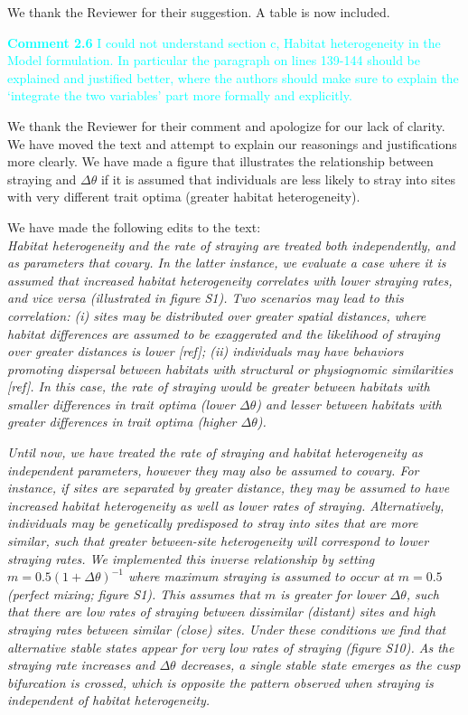 \documentclass[ucm,12pt]{ucletter}
\newcounter{section}
\begin{document}
\begin{letter}
 We thank the Reviewer for their suggestion. A table is now included. 

\noindent \textcolor{cyan}{
{\bf Comment 2.6} I could not understand section c, Habitat heterogeneity in the Model formulation. In particular the paragraph on lines 139-144 should be explained and justified better, where the authors should make sure to explain the ‘integrate the two variables’ part more formally and explicitly.
}

 We thank the Reviewer for their comment and apologize for our lack of clarity. We have moved the text and attempt to explain our reasonings and justifications more clearly. We have made a figure that illustrates the relationship between straying and $\Delta\theta$ if it is assumed that individuals are less likely to stray into sites with very different trait optima (greater habitat heterogeneity).

\noindent We have made the following edits to the text:\\
 \emph{Habitat heterogeneity and the rate of straying are treated both independently, and as parameters that covary.
In the latter instance, we evaluate a case where it is assumed that increased habitat heterogeneity correlates with lower straying rates, and vice versa (illustrated in figure S1).
Two scenarios may lead to this correlation: 
(\emph{i}) sites may be distributed over greater spatial distances, where habitat differences are assumed to be exaggerated and the likelihood of straying over greater distances is lower [ref];
(\emph{ii}) individuals may have behaviors promoting dispersal between habitats with structural or physiognomic similarities [ref].
In this case, the rate of straying would be greater between habitats with smaller differences in trait optima (lower $\Delta\theta$) and lesser between habitats with greater differences in trait optima (higher $\Delta\theta$).}

 \emph{Until now, we have treated the rate of straying and habitat heterogeneity as independent parameters, however they may also be assumed to covary.
For instance, if sites are separated by greater distance, they may be assumed to have increased habitat heterogeneity as well as lower rates of straying.
Alternatively, individuals may be genetically predisposed to stray into sites that are more similar, such that greater between-site heterogeneity will correspond to lower straying rates.
We implemented this inverse relationship by setting $m = 0.5(1 + \Delta\theta)^{-1}$ where maximum straying is assumed to occur at $m=0.5$ (perfect mixing; figure S1).
This assumes that $m$ is greater for lower $\Delta\theta$, such that there are low rates of straying between dissimilar (distant) sites and high straying rates between similar (close) sites.
Under these conditions we find that alternative stable states appear for very low rates of straying (figure S10). %
As the straying rate increases and $\Delta\theta$ decreases, a single stable state emerges as the cusp bifurcation is crossed, which is opposite the pattern observed when straying is independent of habitat heterogeneity.}


\end{letter}
\end{document}
